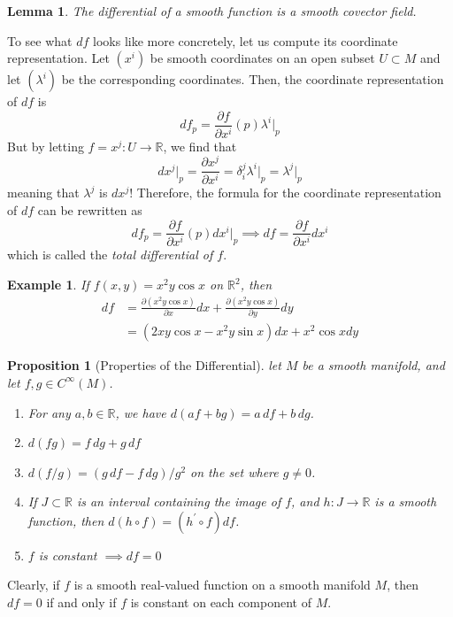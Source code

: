\documentclass{article}
\newtheorem{proposition}[theorem]{Proposition}
\newtheorem{lemma}[theorem]{Lemma}
\newtheorem{example}{Example}[section]
\theoremstyle{remark}
\theoremstyle{definition}
\begin{document}
    \begin{lemma}
    The differential of a smooth function is a smooth covector field. 
    \end{lemma}

    To see what $df$ looks like more concretely, let us compute its coordinate representation. Let $(x^i)$ be smooth coordinates on an open subset $U \subset M$ and let $(\lambda^i)$ be the corresponding coordinates. Then, the coordinate representation of $df$ is
    \[df_p = \frac{\partial f}{\partial x^i} (p) \lambda^i \big|_p\]
    But by letting $f = x^j: U \longrightarrow \mathbb{R}$, we find that
    \[d x^j \big|_p = \frac{\partial x^j}{\partial x^i} = \delta_i^j \lambda^i \big|_p = \lambda^j \big|_p\]
    meaning that $\lambda^j$ is $dx^j$! Therefore, the formula for the coordinate representation of $df$ can be rewritten as
    \[df_p = \frac{\partial f}{\partial x^i} (p) dx^i \big|_p \implies df = \frac{\partial f}{\partial x^i} dx^i\]
    which is called the \textit{total differential of $f$}. 

    \begin{example}
    If $f(x, y) = x^2 y \cos{x}$ on $\mathbb{R}^2$, then 
    \begin{align*}
    df & = \frac{\partial( x^2 y \cos{x})}{\partial x} dx + \frac{\partial (x^2 y \cos{x})}{\partial y} dy \\
    & = (2xy \cos{x} - x^2 y \sin{x}) dx + x^2 \cos{x} dy
    \end{align*}
    \end{example}

    \begin{proposition}[Properties of the Differential]
    let $M$ be a smooth manifold, and let $f, g \in C^\infty (M)$. 
    \begin{enumerate}
        \item For any $a, b \in \mathbb{R}$, we have $d(a f + b g) = a\,df + b\,dg$. 
        \item $d(fg) = f\,dg + g\,df$
        \item $d(f/g) = (g\,df - f\,dg)/g^2$ on the set where $g \neq 0$. 
        \item If $J \subset \mathbb{R}$ is an interval containing the image of $f$, and $h: J \longrightarrow \mathbb{R}$ is a smooth function, then $d(h \circ f) = (h^\prime \circ f) df$. 
        \item $f$ is constant $\implies df = 0$
    \end{enumerate}
    \end{proposition}
    Clearly, if $f$ is a smooth real-valued function on a smooth manifold $M$, then $df = 0$ if and only if $f$ is constant on each component of $M$. 
\end{document}
